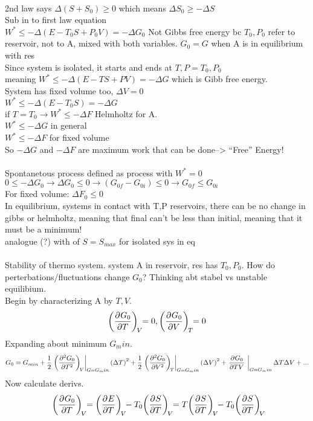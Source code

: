 \documentclass{article}
\begin{document}
\\
2nd law says $\Delta(S+S_0)\geq0$ which means $\Delta S_0 \geq -\Delta S$\\
Sub in to first law equation \\
$W^*\leq -\Delta (E-T_0S+P_0V)=-\Delta G_0$
Not Gibbs free energy bc $T_0,P_0$ refer to reservoir, not to A, mixed with both variables.
$G_0=G$ when A is in equilibrium with res
\\
Since system is isolated, it starts and ends at $T,P=T_0,P_0$\\
meaning $W^*\leq -\Delta (E-TS+PV)=-\Delta G$ which is Gibb free energy. \\
System has fixed volume too, $\Delta V=0$\\
$W^*\leq -\Delta (E-T_0S)=-\Delta G$\\
if $T=T_0\rightarrow W^*\leq -\Delta F$ Helmholtz for A.\\
$W^*\leq -\Delta G$ in general\\
$W^*\leq -\Delta F$ for fixed volume\\
So $ -\Delta G$ and $-\Delta F$ are maximum work that can be done--> ``Free'' Energy!
\\
\\
Spontanetous process defined as process with $W^*=0$\\
$0\leq -\Delta G_0\rightarrow \Delta G_0\leq0\rightarrow (G_{0f}-G_{0i})\leq0\rightarrow \boxed{G_{0f}\leq G_{0i}}$
\\
For fixed volume: $\Delta F_0\leq0$\\
In equilibrium, systems in contact with T,P reservoirs, there can be no change in gibbs or helmholtz, meaning that final can't be less than initial, meaning that it must be a minimum! 
\\
analogue (?) with of $S=S_{max}$ for isolated sys in eq
\\
\\
Stability of thermo system. system A in reservoir, res has $T_0,P_0$. How do perterbations/fluctuations change $G_0$? Thinking abt stabel vs unstable equilibium. 
\\
Begin by characterizing A by $T,V$. 
\\
$$\pder{G_0}{T}[V]=0,\pder{G_0}{V}[T]=0$$
Expanding about minimum $G_min$.
$$G_0=G_{min}+\oo{2}\eval{\pder[2]{G_0}{T}[V]~}_{G=G_min}\qty(\Delta T)^2+\oo{2}\eval{\pder[2]{G_0}{V}[T]~}_{G=G_min}\qty(\Delta V)^2+\eval{\pder{G_0}{TV}~}_{G=G_min}\Delta T\Delta V+...$$
Now calculate derivs. 
$$\pder{G_0}{T}[V]=\pder{E}{T}[V]-T_0\pder{S}{T}[V]=T\pder{S}{T}[V]-T_0\pder{S}{T}[V]$$
\end{document}
